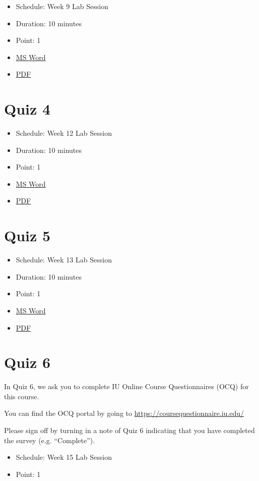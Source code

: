 \begin{itemize}

\item
  Schedule: Week 9 Lab Session
\item
  Duration: 10 minutes
\item
  Point: 1
\item
  \href{https://drive.google.com/open?id=0B88HKpainTSfejluSnRkQW5Oakk}{MS
  Word}
\item
  \href{https://drive.google.com/open?id=0B88HKpainTSfNmR5b2M0Um1NV28}{PDF}
\end{itemize}

\section{Quiz 4}\label{quiz-4}

\begin{itemize}

\item
  Schedule: Week 12 Lab Session
\item
  Duration: 10 minutes
\item
  Point: 1
\item
  \href{https://drive.google.com/open?id=0B88HKpainTSfYzJuN29pY1JoSFU}{MS
  Word}
\item
  \href{https://drive.google.com/open?id=0B88HKpainTSfNGhPMlBadXJURm8}{PDF}
\end{itemize}

\section{Quiz 5}\label{quiz-5}

\begin{itemize}

\item
  Schedule: Week 13 Lab Session
\item
  Duration: 10 minutes
\item
  Point: 1
\item
  \href{https://drive.google.com/open?id=0B88HKpainTSfdUl5QktlUGx1dFU}{MS
  Word}
\item
  \href{https://drive.google.com/open?id=0B88HKpainTSfZFU4dE9acktNMG8}{PDF}
\end{itemize}

\section{Quiz 6}\label{quiz-6}

In Quiz 6, we ask you to complete IU Online Course Questionnaires (OCQ)
for this course.

You can find the OCQ portal by going to
\url{https://coursequestionnaire.iu.edu/}

Please sign off by turning in a note of Quiz 6 indicating that you have
completed the survey (e.g. ``Complete'').

\begin{itemize}

\item
  Schedule: Week 15 Lab Session
\item
  Point: 1
\end{itemize}
